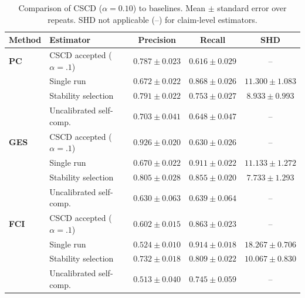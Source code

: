 \begin{table}[t]
\centering\small
\begin{tabular}{llccc}
\toprule
Method & Estimator & Precision & Recall & SHD \\
\midrule
\textbf{PC} & CSCD accepted ($\alpha{=}.1$) & $0.787 \pm 0.023$ & $0.616 \pm 0.029$ & $\text{--}$ \\
 & Single run & $0.672 \pm 0.022$ & $0.868 \pm 0.026$ & $11.300 \pm 1.083$ \\
 & Stability selection & $0.791 \pm 0.022$ & $0.753 \pm 0.027$ & $8.933 \pm 0.993$ \\
 & Uncalibrated self-comp. & $0.703 \pm 0.041$ & $0.648 \pm 0.047$ & $\text{--}$ \\
\midrule
\textbf{GES} & CSCD accepted ($\alpha{=}.1$) & $0.926 \pm 0.020$ & $0.630 \pm 0.026$ & $\text{--}$ \\
 & Single run & $0.670 \pm 0.022$ & $0.911 \pm 0.022$ & $11.133 \pm 1.272$ \\
 & Stability selection & $0.805 \pm 0.028$ & $0.855 \pm 0.020$ & $7.733 \pm 1.293$ \\
 & Uncalibrated self-comp. & $0.630 \pm 0.063$ & $0.639 \pm 0.064$ & $\text{--}$ \\
\midrule
\textbf{FCI} & CSCD accepted ($\alpha{=}.1$) & $0.602 \pm 0.015$ & $0.863 \pm 0.023$ & $\text{--}$ \\
 & Single run & $0.524 \pm 0.010$ & $0.914 \pm 0.018$ & $18.267 \pm 0.706$ \\
 & Stability selection & $0.732 \pm 0.018$ & $0.809 \pm 0.022$ & $10.067 \pm 0.830$ \\
 & Uncalibrated self-comp. & $0.513 \pm 0.040$ & $0.745 \pm 0.059$ & $\text{--}$ \\
\bottomrule
\end{tabular}
\caption{Comparison of CSCD ($\alpha=0.10$) to baselines. Mean $\pm$ standard error over repeats. SHD not applicable (--) for claim-level estimators.}
\label{tab:baselines}
\end{table}
